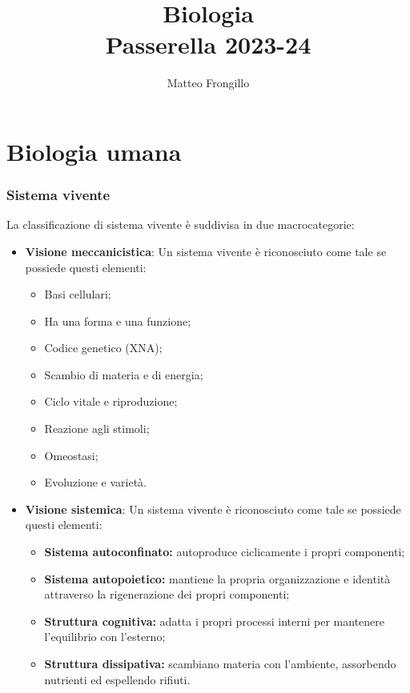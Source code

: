 \documentclass{article}
\title{\textbf{Biologia \\ Passerella 2023-24}}
\author{Matteo Frongillo}
\begin{document}
\maketitle
\tableofcontents
\pagebreak

\part{Biologia umana}
\section{Sistema vivente}
La classificazione di sistema vivente è suddivisa in due macrocategorie:
\begin{itemize}
    \item \textbf{Visione meccanicistica}: Un sistema vivente è riconosciuto come tale
        se possiede questi elementi:
        \begin{itemize}
            \item Basi cellulari;
            \item Ha una forma e una funzione;
            \item Codice genetico (XNA);
            \item Scambio di materia e di energia;
            \item Ciclo vitale e riproduzione;
            \item Reazione agli stimoli;
            \item Omeostasi;
            \item Evoluzione e varietà.
        \end{itemize}
    \item \textbf{Visione sistemica}: Un sistema vivente è riconosciuto come tale
        se possiede questi elementi:
        \begin{itemize}
            \item \textbf{Sistema autoconfinato:} autoproduce ciclicamente i propri componenti;
            \item \textbf{Sistema autopoietico:} mantiene la propria organizzazione e identità
                attraverso la rigenerazione dei propri componenti;
            \item \textbf{Struttura cognitiva:} adatta i propri processi interni per mantenere
                l'equilibrio con l'esterno;
            \item \textbf{Struttura dissipativa:} scambiano materia con l'ambiente, assorbendo
                nutrienti ed espellendo rifiuti.
        \end{itemize}
\end{itemize}
\end{document}
